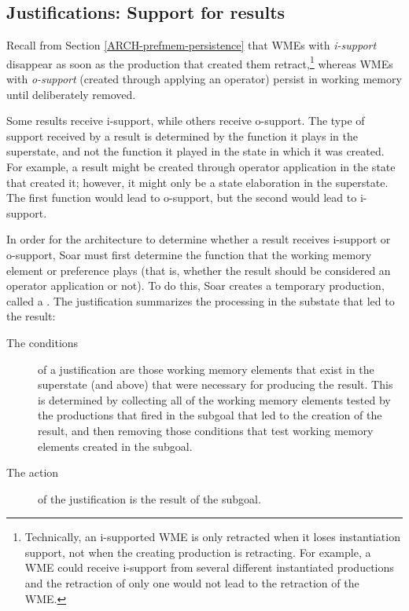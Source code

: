 \subsection{Justifications: Support for results}

Recall from Section \ref{ARCH-prefmem-persistence} that WMEs with \textit{i-support} disappear as soon as the production that created them retract,\footnote{
	Technically, an i-supported WME is only retracted when it loses instantiation support, not when the creating production is retracting. For example, a WME could receive i-support from several different instantiated productions and the retraction of only one would not lead to the retraction of the WME.} 
whereas WMEs with \textit{o-support} (created through applying an operator) persist in working memory until deliberately removed.

Some results receive i-support, while others receive o-support.  The type of support received by a result is determined by the function it plays in the superstate, and not the function it played in the state in which it was created. For example, a result might be created through operator application in the state that created it; however, it might only be a state elaboration in the superstate. The first function would lead to o-support, but the second would lead to i-support.

In order for the architecture to determine whether a result receives i-support or o-support, Soar must first determine the function that the working memory element or preference plays (that is, whether the result should be considered an operator application or not). To do this, Soar creates a temporary production, called a . The justification summarizes the processing in the substate that led to the result:

\vspace{-10pt}
\begin{description}
	\item[The conditions] of a justification are those working memory elements that exist in the superstate (and above) that were necessary for producing the result.  This is determined by collecting all of the working memory elements tested by the productions that fired in the subgoal that led to the creation of the result, and then removing those conditions that test working memory elements created in the subgoal.
	\vspace{-6pt}
	\item[The action] of the justification is the result of the subgoal.
\end{description} 


